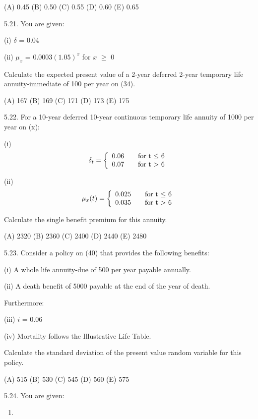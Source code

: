 \documentclass[]{book}
\begin{document}
(A) 0.45 (B) 0.50 (C) 0.55 (D) 0.60 (E) 0.65

5.21. You are given:

(i) \(\delta\) = 0.04

(ii) \(\mu_x\) = 0.0003\((1.05)^x\) for \(x\) \(\ge\) 0

Calculate the expected present value of a 2-year deferred 2-year
temporary life annuity-immediate of 100 per year on (34).

(A) 167 (B) 169 (C) 171 (D) 173 (E) 175

5.22. For a 10-year deferred 10-year continuous temporary life annuity
of 1000 per year on (x):

(i) \[\delta_t = \left\{
  \begin{array}{l l}
    0.06 & \quad \text{for t $\le$ 6}\\
    0.07 & \quad \text{for t $>$ 6}\\
  \end{array} \right.\]

(ii) \[\mu_x(t) = \left\{
  \begin{array}{l l}
    0.025 & \quad \text{for t $\le$ 6}\\
    0.035 & \quad \text{for t $>$ 6}\\
  \end{array} \right.\]

Calculate the single benefit premium for this annuity.

(A) 2320 (B) 2360 (C) 2400 (D) 2440 (E) 2480

5.23. Consider a policy on (40) that provides the following benefits:

(i) A whole life annuity-due of 500 per year payable annually.

(ii) A death benefit of 5000 payable at the end of the year of death.

Furthermore:

(iii) \(i\) = 0.06

(iv) Mortality follows the Illustrative Life Table.

Calculate the standard deviation of the present value random variable
for this policy.

(A) 515 (B) 530 (C) 545 (D) 560 (E) 575

5.24. You are given:

\begin{enumerate}
\def\labelenumi{(\roman{enumi})}
\item
\end{enumerate}
\end{document}
